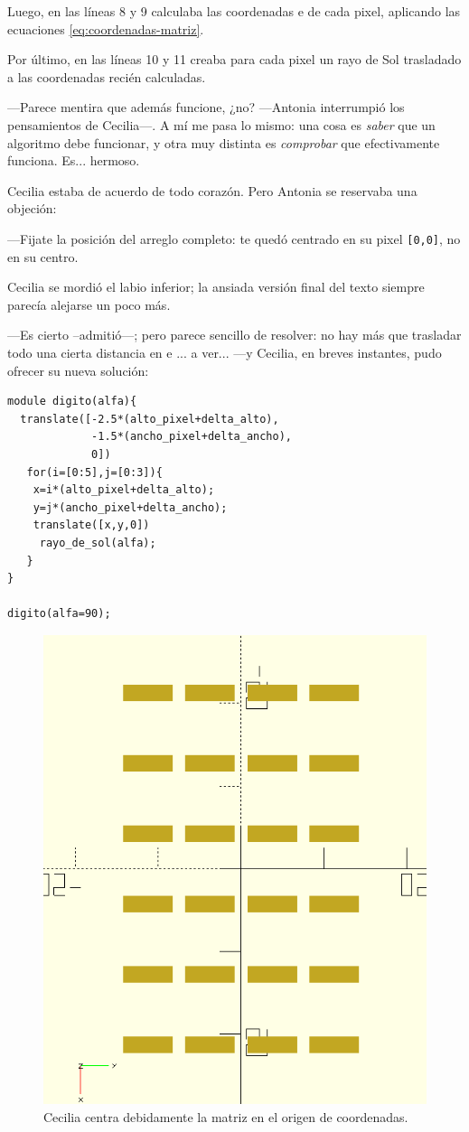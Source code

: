    Luego, en las líneas 8 y 9 calculaba las coordenadas  e
     de cada pixel, aplicando las ecuaciones
    \ref{eq:coordenadas-matriz}.

    Por último, en las líneas 10 y 11 creaba para cada pixel un rayo
    de Sol trasladado a las coordenadas recién calculadas.

    ---Parece mentira que además funcione, ¿no? ---Antonia interrumpió
    los pensamientos de Cecilia---. A mí me pasa lo mismo: una cosa es
    \emph{saber} que un algoritmo debe funcionar, y otra muy distinta
    es \emph{comprobar} que efectivamente funciona. Es... hermoso.

    Cecilia estaba de acuerdo de todo corazón. Pero Antonia se
    reservaba una objeción:

    ---Fijate la posición del arreglo completo: te quedó centrado en
    su pixel \texttt{[0,0]}, no en su centro.
    
    Cecilia se mordió el labio inferior; la ansiada versión final del
    texto siempre parecía alejarse un poco más.

    ---Es cierto --admitió---; pero parece sencillo de resolver: no
    hay más que trasladar todo una cierta distancia en  e
    ... a ver... ---y Cecilia, en breves instantes, pudo
    ofrecer su nueva solución:

    \begin{lstlisting}
module digito(alfa){
  translate([-2.5*(alto_pixel+delta_alto),
             -1.5*(ancho_pixel+delta_ancho),
             0])
   for(i=[0:5],j=[0:3]){
    x=i*(alto_pixel+delta_alto);
    y=j*(ancho_pixel+delta_ancho);
    translate([x,y,0])
     rayo_de_sol(alfa);
   } 
}

digito(alfa=90);
    \end{lstlisting}

  
  \begin{figure}[ht]
    \centering
    \includegraphics[width=.45\textwidth]{imagenes/matriz-completa-centrada-0}    
    \caption{Cecilia centra debidamente la matriz en el origen de
      coordenadas.}
    \label{fig:matriz-completa-centrada-0}
  \end{figure}
  


